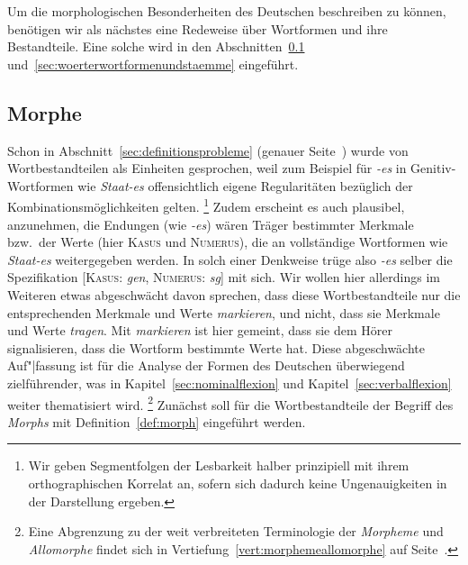
Um die morphologischen Besonderheiten des Deutschen beschreiben zu können, benötigen wir als nächstes eine Redeweise über Wortformen und ihre Bestandteile.
Eine solche wird in den Abschnitten~\ref{sec:morphe} und~\ref{sec:woerterwortformenundstaemme} eingeführt.

\subsection{Morphe}
\label{sec:morphe}

Schon in Abschnitt~\ref{sec:definitionsprobleme} (genauer Seite~\pageref{arbref:9234645}) wurde von Wortbestandteilen als Einheiten gesprochen, weil zum Beispiel für \textit{-es} in Genitiv-Wortformen wie \textit{Staat-es} offensichtlich eigene Regularitäten bezüglich der Kombinationsmöglichkeiten gelten.%
\footnote{Wir geben Segmentfolgen der Lesbarkeit halber prinzipiell mit ihrem orthographischen Korrelat an, sofern sich dadurch keine Ungenauigkeiten in der Darstellung ergeben.}
Zudem erscheint es auch plausibel, anzunehmen, die Endungen (wie \textit{-es}) wären Träger bestimmter Merkmale bzw.\ der Werte (hier \textsc{Kasus} und \textsc{Numerus}), die an vollständige Wortformen wie \textit{Staat-es} weitergegeben werden.
In solch einer Denkweise trüge also \textit{-es} selber die Spezifikation [\textsc{Kasus}: \textit{gen}, \textsc{Numerus}: \textit{sg}] mit sich.
Wir wollen hier allerdings im Weiteren etwas abgeschwächt davon sprechen, dass diese Wortbestandteile nur die entsprechenden Merkmale und Werte \textit{markieren}, und nicht, dass sie Merkmale und Werte \textit{tragen}.
Mit \textit{markieren} ist hier gemeint, dass sie dem Hörer signalisieren, dass die Wortform bestimmte Werte hat.
Diese abgeschwächte Auf"|fassung ist für die Analyse der Formen des Deutschen überwiegend zielführender, was in Kapitel~\ref{sec:nominalflexion} und Kapitel~\ref{sec:verbalflexion} weiter thematisiert wird.%
\footnote{Eine Abgrenzung zu der weit verbreiteten Terminologie der \textit{Morpheme} und \textit{Allomorphe} findet sich in Vertiefung~\ref{vert:morphemeallomorphe} auf Seite~\pageref{vert:morphemeallomorphe}.}
Zunächst soll für die Wortbestandteile der Begriff des \textit{Morphs} mit Definition~\ref{def:morph} eingeführt werden.

